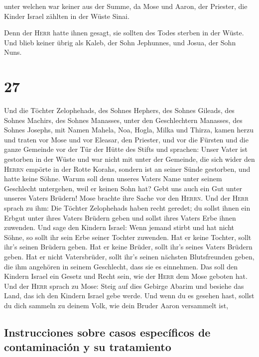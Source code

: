  unter welchen war keiner aus der Summe, da Mose und
Aaron, der Priester, die Kinder Israel zählten in der Wüste Sinai.

 Denn der \textsc{Herr} hatte ihnen gesagt, sie sollten
des Todes sterben in der Wüste. Und blieb keiner übrig als Kaleb, der
Sohn Jephunnes, und Josua, der Sohn Nuns.

\hypertarget{section-26}{%
\section{27}\label{section-26}}

 Und die Töchter Zelophehads, des Sohnes Hephers, des
Sohnes Gileads, des Sohnes Machirs, des Sohnes Manasses, unter den
Geschlechtern Manasses, des Sohnes Josephs, mit Namen Mahela, Noa,
Hogla, Milka und Thirza, kamen herzu  und traten vor Mose
und vor Eleasar, den Priester, und vor die Fürsten und die ganze
Gemeinde vor der Tür der Hütte des Stifts und sprachen: 
Unser Vater ist gestorben in der Wüste und war nicht mit unter der
Gemeinde, die sich wider den \textsc{Herrn} empörte in der Rotte Korahs,
sondern ist an seiner Sünde gestorben, und hatte keine Söhne.
 Warum soll denn unseres Vaters Name unter seinem
Geschlecht untergehen, weil er keinen Sohn hat? Gebt uns auch ein Gut
unter unseres Vaters Brüdern!  Mose brachte ihre Sache vor
den \textsc{Herrn}.  Und der \textsc{Herr} sprach zu ihm:
 Die Töchter Zelophehads haben recht geredet; du sollst
ihnen ein Erbgut unter ihres Vaters Brüdern geben und sollst ihres
Vaters Erbe ihnen zuwenden.  Und sage den Kindern Israel:
Wenn jemand stirbt und hat nicht Söhne, so sollt ihr sein Erbe seiner
Tochter zuwenden.  Hat er keine Tochter, sollt ihr's
seinen Brüdern geben.  Hat er keine Brüder, sollt ihr's
seines Vaters Brüdern geben.  Hat er nicht Vatersbrüder,
sollt ihr's seinen nächsten Blutsfreunden geben, die ihm angehören in
seinem Geschlecht, dass sie es einnehmen. Das soll den Kindern Israel
ein Gesetz und Recht sein, wie der \textsc{Herr} dem Mose geboten hat.
 Und der \textsc{Herr} sprach zu Mose: Steig auf dies
Gebirge Abarim und besiehe das Land, das ich den Kindern Israel gebe
werde.  Und wenn du es gesehen hast, sollst du dich
sammeln zu deinem Volk, wie dein Bruder Aaron versammelt ist,

\hypertarget{instrucciones-sobre-casos-especuxedficos-de-contaminaciuxf3n-y-su-tratamiento}{%
\subsection{Instrucciones sobre casos específicos de contaminación y su
tratamiento}\label{instrucciones-sobre-casos-especuxedficos-de-contaminaciuxf3n-y-su-tratamiento}}


